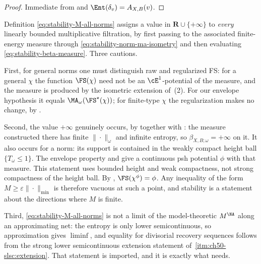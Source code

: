 \begin{proof}
Immediate from  and
$\Ent(\delta_v)=A_{X,B}(v)$.
\end{proof}

\begin{remark}
\label{rem:ch50-M-all-norms-scope}
Definition \eqref{eq:stability-M-all-norms} assigns a value in
$\mathbf R\cup\{+\infty\}$ to \emph{every} linearly bounded
multiplicative filtration, by first passing to the associated
finite-energy measure through
\eqref{eq:stability-norm-ma-isometry} and then evaluating
\eqref{eq:stability-beta-measure}.  Three cautions.

First, for general norms one must distinguish raw and regularized FS: for a
general $\chi$ the function $\FS(\chi)$ need not be an
$\cE^1$-potential of the measure, and the measure is produced by the
isometric extension of \,(2).  For
our envelope hypothesis it equals $\MA_\omega(\FS^\star(\chi))$; for
finite-type $\chi$ the regularization makes no change, by
.

Second, the value $+\infty$ genuinely occurs, by
 together with
: the measure constructed there has finite
$\|\cdot\|_\omega$ and infinite entropy, so
$\beta_{X,B;\omega}=+\infty$ on it.  It also occurs for a norm:
its support is contained in the weakly compact height ball
$\{T_\omega\le1\}$.  The envelope property and
\cite[Theorem~12.12]{BJ22} give a continuous psh potential $\phi$ with
that measure.  This statement uses bounded height and weak compactness,
not strong compactness of the height ball.  By \cite[Proposition~2.29]{BJKS1},
$\FS(\chi^\phi)=\phi$.  Any inequality of the form
$M\ge\varepsilon\|\cdot\|_{\min}$ is therefore vacuous at such a point,
and stability is a statement about the directions where $M$ is finite.

Third, \eqref{eq:stability-M-all-norms} is not a limit of the
model-theoretic $M^{\NA}$ along an approximating net: the entropy is only
lower semicontinuous, so approximation gives $\liminf$, and equality
for divisorial recovery sequences follows from the strong lower semicontinuous extension statement of
\,\cref{itm:ch50-slsc:extension}.  That statement
is imported, and it is exactly what
 needs.
\end{remark}

